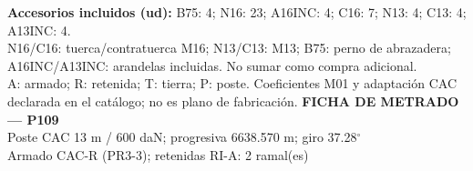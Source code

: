 \begingroup\scriptsize
\textbf{Accesorios incluidos (ud):} B75: 4; N16: 23; A16INC: 4; C16: 7; N13: 4; C13: 4; A13INC: 4.\\
N16/C16: tuerca/contratuerca M16; N13/C13: M13; B75: perno de abrazadera; A16INC/A13INC: arandelas incluidas. No sumar como compra adicional.\\
A: armado; R: retenida; T: tierra; P: poste. Coeficientes M01 y adaptación CAC declarada en el catálogo; no es plano de fabricación.
\endgroup\endgroup
\clearpage{}
\begingroup\small\setlength{\parskip}{3pt}\renewcommand{\arraystretch}{1.05}
\textbf{\large FICHA DE METRADO — P109}\\[4pt]
Poste CAC 13 m / 600 daN; progresiva 6638.570 m; giro 37.28\ensuremath{^\circ}\\
Armado CAC-R (PR3-3); retenidas RI-A: 2 ramal(es)\\
\begingroup\scriptsize
